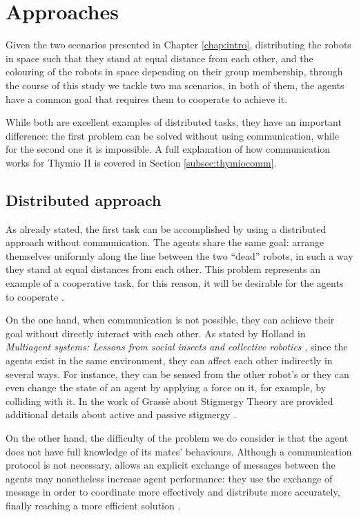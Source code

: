 \section{Approaches}
\label{sec:approaches}
Given the two scenarios presented in Chapter \ref{chap:intro}, distributing the 
robots in space such that they stand at equal distance from each other, and the 
colouring of the robots in space depending on their group membership, through 
the course of this study we tackle two \gls{ma} scenarios, in both of them, the 
agents have a common goal that requires them to cooperate to achieve it. 

While both are excellent examples of distributed tasks, they have an important 
difference: the first problem can be solved without using communication, while 
for the second one it is impossible.
A full explanation of how communication works for Thymio II is covered in 
Section \ref{subsec:thymiocomm}.

\subsection{Distributed approach}
\label{subsec:dist}

As already stated, the first task can be accomplished by using a distributed 
approach without communication.
The agents share the same goal: arrange themselves uniformly along the line 
between the two “dead” robots, in such a way they stand at equal distances from 
each other.
This problem represents an example of a cooperative task, for this reason, it will 
be desirable for the agents to cooperate \cite[][]{barrett2017making}. 

On the one hand, when communication is not possible, they can achieve their 
goal without directly interact with each other. 
As stated by Holland in \emph{Multiagent systems: Lessons from social insects and 
collective robotics} \cite[][]{holland1996multiagent}, since the agents exist in the 
same environment, they can affect each other indirectly in several ways.
For instance, they can be sensed from the other robot’s or they can even change 
the state of an agent by applying a force on it, for example, by colliding with it.
In the work of Grassè about Stigmergy Theory are provided additional details 
about active and passive stigmergy \cite[][]{grasse1959reconstruction}.

On the other hand, the difficulty of the problem we do consider is that the agent 
does not have full knowledge of its mates’ behaviours.
Although a communication protocol is not necessary, allows an explicit exchange 
of messages between the agents may nonetheless increase agent performance: 
they use the exchange of message in order to coordinate more effectively and 
distribute more accurately, finally reaching a more efficient solution 
\cite{panait2005cooperative}.

